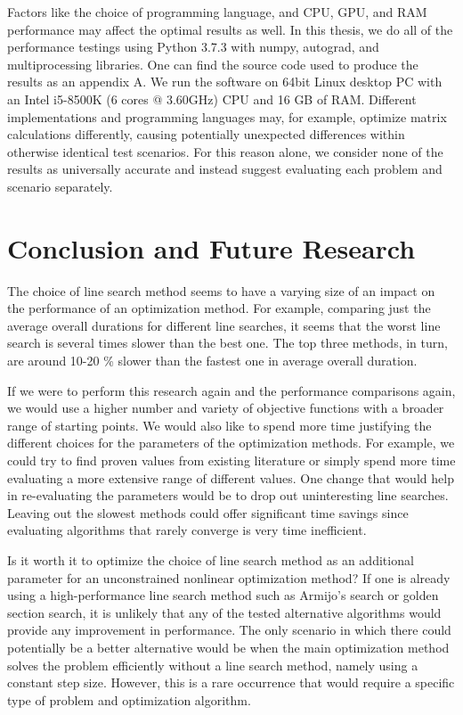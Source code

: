 \documentclass[english, 12pt, a4paper, sci, utf8, a-1b, online, table]{aaltothesis}
\begin{document}
Factors like the choice of programming language, and CPU, GPU, and RAM performance may affect the optimal results as well. In this thesis, we do all of the performance testings using Python 3.7.3 with numpy, autograd, and multiprocessing libraries. One can find the source code used to produce the results as an appendix A. We run the software on 64bit Linux desktop PC with an Intel i5-8500K (6 cores @ 3.60GHz) CPU and 16 GB of RAM. Different implementations and programming languages may, for example, optimize matrix calculations differently, causing potentially unexpected differences within otherwise identical test scenarios. For this reason alone, we consider none of the results as universally accurate and instead suggest evaluating each problem and scenario separately.


\section{Conclusion and Future Research}
\label{sect:conclusion}


The choice of line search method seems to have a varying size of an impact on the performance of an optimization method. For example, comparing just the average overall durations for different line searches, it seems that the worst line search is several times slower than the best one. The top three methods, in turn, are around 10-20 \% slower than the fastest one in average overall duration. 

If we were to perform this research again and the performance comparisons again, we would use a higher number and variety of objective functions with a broader range of starting points. We would also like to spend more time justifying the different choices for the parameters of the optimization methods. For example, we could try to find proven values from existing literature or simply spend more time evaluating a more extensive range of different values. One change that would help in re-evaluating the parameters would be to drop out uninteresting line searches. Leaving out the slowest methods could offer significant time savings since evaluating algorithms that rarely converge is very time inefficient. 

Is it worth it to optimize the choice of line search method as an additional parameter for an unconstrained nonlinear optimization method? If one is already using a high-performance line search method such as Armijo's search or golden section search, it is unlikely that any of the tested alternative algorithms would provide any improvement in performance. The only scenario in which there could potentially be a better alternative would be when the main optimization method solves the problem efficiently without a line search method, namely using a constant step size. However, this is a rare occurrence that would require a specific type of problem and optimization algorithm.
\end{document}

